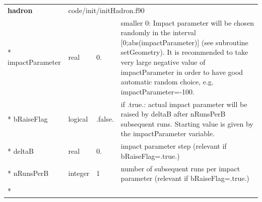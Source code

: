\documentclass{article}
\begin{document}

\begin{longtable}{llll}
\toprule
\textbf{\large{hadron}} & \multicolumn{3}{l}{\footnotesize{code/init/initHadron.f90}}\\*
\midrule
\endfirsthead
\midrule
\endhead
impactParameter & \begin{minipage}[t]{2cm}real\end{minipage} & \begin{minipage}[t]{2cm}0.\end{minipage} & \begin{minipage}[t]{12cm}smaller 0: Impact parameter will be chosen randomly in the interval [0;abs(impactParameter)] (see subroutine setGeometry). It is recommended to take very large negative value of impactParameter in order to have good automatic random choice, e.g. impactParameter=-100.\end{minipage}\\*
\midrule
bRaiseFlag & \begin{minipage}[t]{2cm}logical\end{minipage} & \begin{minipage}[t]{2cm}.false.\end{minipage} & \begin{minipage}[t]{12cm}if .true.: actual impact parameter will be raised by deltaB after nRunsPerB subsequent runs. Starting value is given by the impactParameter variable.\end{minipage}\\*
\midrule
deltaB & \begin{minipage}[t]{2cm}real\end{minipage} & \begin{minipage}[t]{2cm}0.\end{minipage} & \begin{minipage}[t]{12cm}impact parameter step (relevant if bRaiseFlag=.true.)\end{minipage}\\*
\midrule
nRunsPerB & \begin{minipage}[t]{2cm}integer\end{minipage} & \begin{minipage}[t]{2cm}1\end{minipage} & \begin{minipage}[t]{12cm}number of subsequent runs per impact parameter (relevant if bRaiseFlag=.true.)\end{minipage}\\*

\end{longtable}
\end{document}
